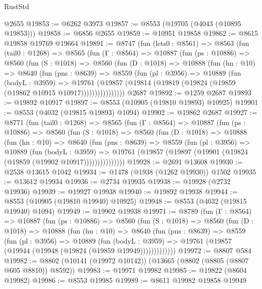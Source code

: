 \begin{lexlean}{RustStd}
\begin{coremodule}
    @2655
@19853 := @6262 @3973
@19857 := @8553 (@19705 (@4043 (@10895 @19853)))
@19858 := @6856 @2655
@19859 := @10951 @19858
@19862 := @8615 @19858 @19769 @19664
@19891 := @8747
    (fun (lets0 : @8561) =>
    @8563
      (fun (tail0 : @1268) =>
      @8565
        (fun (Γ : @8564) =>
        @10887
          (fun (ps : @10886) =>
          @8560
            (fun (S : @1018) =>
            @8560
              (fun (D : @1018) =>
              @10888
                (fun (hn : @10) =>
                @8640
                  (fun (pns : @8639) =>
                  @8559
                    (fun (pl : @3956) =>
                    @10889
                      (fun (bodyL : @3959) =>
                      @19761
                        (@19857
                          (@19814 (@19819 (@19824 (@19859 (@19862 @10915 @10917))))))))))))))))
    @2687
@19892 := @1259 @2687
@19893 := @19892 @10917
@19897 := @8553 (@10905 (@19810 @19893) @10925)
@19901 := @8553 (@4032 (@19815 @19893) @1094)
@19902 := @19862 @2687
@19927 := @8771
    (fun (tail0 : @1268) =>
    @8565
      (fun (Γ : @8564) =>
      @10887
        (fun (ps : @10886) =>
        @8560
          (fun (S : @1018) =>
          @8560
            (fun (D : @1018) =>
            @10888
              (fun (hn : @10) =>
              @8640
                (fun (pns : @8639) =>
                @8559
                  (fun (pl : @3956) =>
                  @10889
                    (fun (bodyL : @3959) =>
                    @19761 (@19857 (@19897 (@19901 (@19824 (@19859 (@19902 @10917)))))))))))))))
@19928 := @2691 @13608
@19930 := @2538 @13615 @1042
@19934 := @1478 (@1938 (@1262 @19930)) @1502
@19935 := @13612 @19934
@19936 := @2734 @19935
@19938 := @19928 (@2732 @19936)
@19939 := @19927 @19938
@19940 := @19892 @19938
@19944 := @8553 (@10905 (@19810 @19940) @10925)
@19948 := @8553 (@4032 (@19815 @19940) @1094)
@19949 := @19902 @19938
@19971 := @8789
    (fun (Γ : @8564) =>
    @10887
      (fun (ps : @10886) =>
      @8560
        (fun (S : @1018) =>
        @8560
          (fun (D : @1018) =>
          @10888
            (fun (hn : @10) =>
            @8640
              (fun (pns : @8639) =>
              @8559
                (fun (pl : @3956) =>
                @10889
                  (fun (bodyL : @3959) =>
                  @19761 (@19857 (@19944 (@19948 (@19824 (@19859 @19949)))))))))))))
@19972 := @8807 @584
@19982 := @8802 (@10141 (@19972 @10142)) (@13665 (@8802 (@8805 (@8807 @605 @8810)) @8592))
@19983 := @19971 @19982
@19985 := @19822 (@8604 @19982)
@19986 := @8553 @19985
@19989 := @8611 @19982 @19858 @19949

\end{coremodule}
\end{lexlean}
